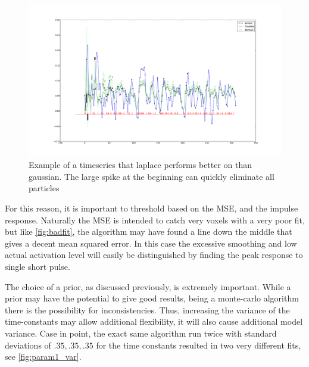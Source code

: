 \begin{figure}
\label{fig:highhard}
\includegraphics[trim=10cm 4cm 10cm 4cm, width=16cm]{images/active_difficult}
\caption{Example of a timeseries that laplace performs better on than
gaussian. The large spike at the beginning can quickly eliminate all particles} 

\end{figure}

For this reason, it is important to threshold based on the MSE, and the
impulse response. Naturally the MSE is intended to catch very voxels with a
very poor fit,
but like \autoref{fig:badfit}, the algorithm may have found a line
down the middle that gives a decent mean squared error. In this case
the excessive smoothing and low actual activation level will easily
be distinguished by finding the peak response to single short pulse. 

The choice of a prior, as discussed previously, is extremely important. While a
prior may have the potential to give good results, being a monte-carlo algorithm
there is the possibility for inconsistencies. Thus, increasing the variance
of the time-constants may allow additional flexibility, it will also cause
additional model variance. Case in point, the exact same algorithm run twice
with standard deviations of $.35, .35, .35$ for the time constants resulted in two
very different fits, see \autoref{fig:param1_var}.

